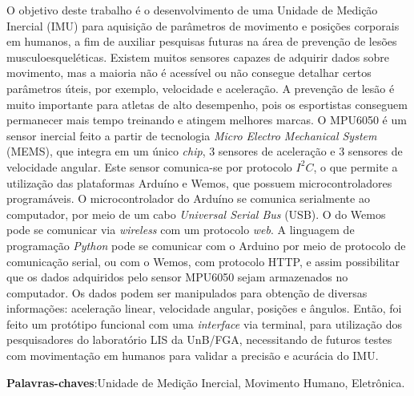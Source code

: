 \begin{resumo}
 
 \noindent
 O objetivo deste trabalho é o desenvolvimento de uma Unidade de Medição Inercial (IMU) para aquisição de parâmetros de movimento e posições corporais em humanos, a fim de auxiliar pesquisas futuras na área de prevenção de lesões musculoesqueléticas. Existem muitos sensores capazes de adquirir dados sobre  movimento, mas a maioria não é acessível ou não consegue detalhar certos parâmetros úteis, por exemplo, velocidade e aceleração. A prevenção de lesão é muito importante para atletas de alto desempenho, pois os esportistas conseguem permanecer mais tempo treinando e atingem melhores marcas. O MPU6050 é um sensor inercial feito a partir de tecnologia \textit{Micro Electro Mechanical System} (MEMS), que integra em um único \textit{chip}, 3 sensores de aceleração e 3 sensores de velocidade angular. Este sensor comunica-se por protocolo $I^2C$, o que permite a utilização das plataformas Arduíno e Wemos, que possuem microcontroladores programáveis. O microcontrolador do Arduíno se comunica serialmente ao computador, por meio de um cabo \textit{Universal  Serial Bus} (USB). O do Wemos pode se comunicar via \textit{wireless} com um protocolo \textit{web}. A linguagem de programação \textit{Python} pode se comunicar com o Arduino por meio de protocolo de comunicação serial, ou com o Wemos, com protocolo HTTP, e assim possibilitar que os dados adquiridos pelo sensor MPU6050 sejam armazenados no computador. Os dados podem ser manipulados para obtenção de diversas informações: aceleração linear, velocidade angular, posições e ângulos. Então, foi feito um protótipo funcional com uma \textit{interface} via terminal, para utilização dos pesquisadores do laboratório LIS da UnB/FGA, necessitando de futuros testes com movimentação em humanos para validar a precisão e acurácia do IMU. 
 
 \vspace{\onelineskip}
 \textbf{Palavras-chaves}:Unidade de Medição Inercial, Movimento Humano, Eletrônica.
\end{resumo}
